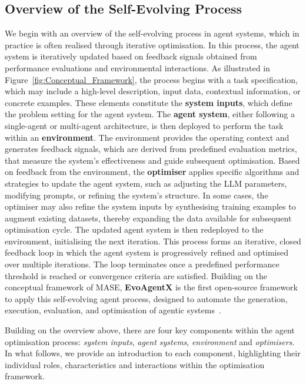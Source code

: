 \documentclass[]{selfevolagent}
\theoremstyle{plain}
\theoremstyle{definition}
\theoremstyle{remark}
\begin{document}
\subsection{Overview of the Self-Evolving Process}
We begin with an overview of the self-evolving process in agent systems, which in practice is often realised through iterative optimisation. In this process, the agent system is iteratively updated based on feedback signals obtained from performance evaluations and environmental interactions. 
As illustrated in Figure~\ref{fig:Conceptual_Framework}, the process begins with a task specification, which may include a high-level description, input data, contextual information, or concrete examples. These elements constitute the \textbf{system inputs}, which define the problem setting for the agent system. The \textbf{agent system}, either following a single-agent or multi-agent architecture, is then deployed to perform the task within an \textbf{environment}. The environment provides the operating context and generates feedback signals, which are derived from predefined evaluation metrics, that measure the system's effectiveness and guide subsequent optimisation. Based on feedback from the environment, the \textbf{optimiser} applies specific algorithms and strategies to update the agent system, such as adjusting the LLM parameters, modifying prompts, or refining the system's structure. In some cases, the optimiser may also {refine the system inputs} by synthesising training examples to augment existing datasets, thereby expanding the data available for subsequent optimisation cycle. The updated agent system is then redeployed to the environment, initialising the next iteration. This process forms an iterative, closed feedback loop in which the agent system is progressively refined and optimised over multiple iterations. The loop terminates once a predefined performance threshold is reached or convergence criteria are satisfied.  Building on the conceptual framework of MASE, {\color{selfevolagent_dark!120}\textbf{EvoAgentX}} is the first open-source framework to apply this self-evolving agent process, designed to automate the generation, execution, evaluation, and optimisation of agentic systems~\citep{wang2025evoagentx}.

Building on the overview above, there are four key components within the agent optimisation process: \textit{system inputs}, \textit{agent systems}, \textit{environment} and \textit{optimisers}. In what follows, we provide an introduction to each component, highlighting their individual roles, characteristics and interactions within the optimisation framework. 
\end{document}
